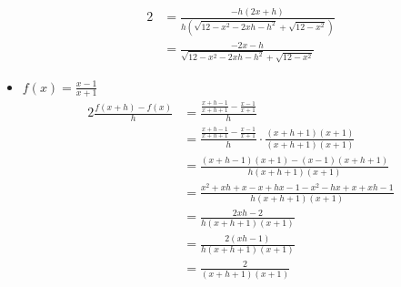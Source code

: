 \documentclass{templateNote}
\begin{document}
\begin{itemize}
\begin{alignat*}{2}
        &= \frac{-h(2x + h)}{h(\sqrt{12 - x^2 - 2xh - h^2} + \sqrt{12 - x^2})} \\
        &= \frac{-2x - h}{\sqrt{12 - x^2 - 2xh - h^2} + \sqrt{12 - x^2}}
    \end{alignat*}
    \item $f(x) = \frac{x-1}{x+1}$
    \begin{alignat*}{2}
        \frac{f(x+h)-f(x)}{h} &= \frac{\frac{x + h - 1}{x + h + 1} - \frac{x - 1}{x + 1}}{h} \\
        &= \frac{\frac{x + h - 1}{x + h + 1} - \frac{x - 1}{x + 1}}{h} \cdot \frac{(x + h + 1)(x + 1)}{(x + h + 1)(x + 1)} \\
        &= \frac{(x + h - 1)(x + 1) - (x - 1)(x + h + 1)}{h(x + h + 1)(x + 1)} \\
        &= \frac{x^2 + xh + x - x + hx - 1 - x^2 - hx + x + xh - 1}{h(x + h + 1)(x + 1)} \\
        &= \frac{2xh - 2}{h(x + h + 1)(x + 1)} \\
        &= \frac{2(xh - 1)}{h(x + h + 1)(x + 1)} \\
        &= \frac{2}{(x + h + 1)(x + 1)}
    \end{alignat*}
\end{itemize}
\end{document}
